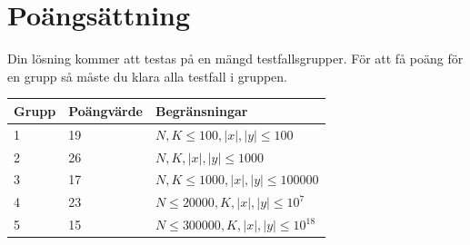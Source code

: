 \section*{Poängsättning}
Din lösning kommer att testas på en mängd testfallsgrupper. För att få poäng för en grupp så måste du klara alla testfall i gruppen.

\begin{tabular}{| l | l | l |}
	\hline
	Grupp & Poängvärde & Begränsningar\\ \hline
	1 & 19 & $N, K \le 100, |x|, |y| \le 100$ \\ \hline
	2 & 26 & $N, K, |x|, |y| \le 1000$ \\ \hline
	3 & 17 & $N, K \le 1000, |x|, |y| \le 100000$ \\ \hline
	4 & 23 & $N \le 20000, K, |x|, |y| \le 10^7$ \\ \hline
	5 & 15 & $N \le 300000, K, |x|, |y| \le 10^{18}$ \\ \hline
\end{tabular}
